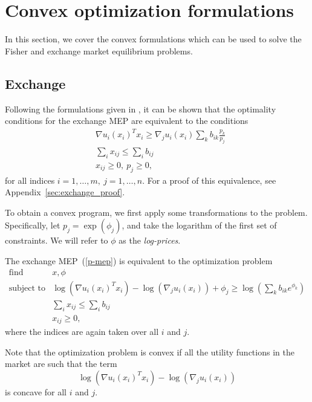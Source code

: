 \documentclass[12pt]{article}
\begin{document}
\section{Convex optimization formulations}
\label{sec:convex_form}
In this section, we cover the convex formulations which can be used to solve
the Fisher and exchange market equilibrium problems.

\subsection{Exchange}
\label{sec:convex_form_exchange}


Following the formulations given in \cite{jain2007polynomial, chen2007note, nenakov1983algorithm}, it can be shown that the optimality conditions for 
the exchange MEP are equivalent to the conditions
\begin{equation}
\begin{array}{ll}
& \nabla u_i(x_i)^T x_i \geq  \nabla_j u_i(x_i) \sum_k b_{ik} \frac{p_k}{p_j}\\
& \sum_i x_{ij} \leq \sum_i b_{ij}\\
& x_{ij} \geq 0,\ p_j \geq 0,
\end{array}
\label{p-exchange-gp}
\end{equation}
for all indices $i=1,\ldots,m,\ j=1,\ldots,n$.
For a proof of this equivalence, see Appendix~\ref{sec:exchange_proof}.

To obtain a convex program, we first apply some transformations to the
problem.
Specifically, let $p_j = \exp(\phi_j)$, and take the logarithm of
the first set of constraints.
We will refer to $\phi$ as the \emph{log-prices}.

The exchange MEP~(\ref{p-mep})
is equivalent to the optimization problem
\begin{equation}
\label{p-exchange}
\begin{array}{ll}
\mbox{find} & x, \phi \\
\mbox{subject to} & \log(\nabla u_i(x_i)^T x_i) - \log(\nabla_j u_i(x_i)) + \phi_j 
\geq \log(\sum_k b_{ik} e^{\phi_k})\\
& \sum_i x_{ij} \leq \sum_i b_{ij}\\
& x_{ij} \geq 0,
\end{array}
\end{equation}
where the indices are again taken over all $i$ and $j$.

Note that the optimization problem is convex if all the utility functions
in the market are such that the term
\begin{equation}
\label{e-util-constraint}
\log(\nabla u_i(x_i)^T x_i) - \log(\nabla_j u_i(x_i))
\end{equation}
is concave for all $i$ and $j$.
\end{document}
